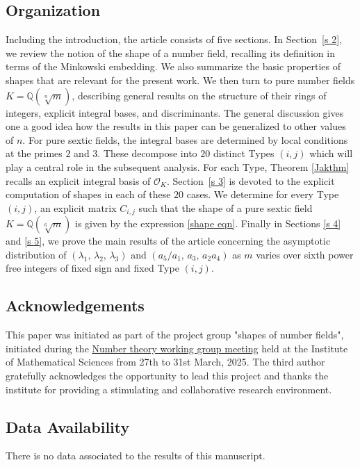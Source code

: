 \documentclass[table]{amsart}
\newcommand{\Q}{\mathbb{Q}}
\newcommand{\cO}{\mathcal{O}}
\numberwithin{equation}{section}
\begin{document}
\subsection{Organization} Including the introduction, the article consists of five sections. In Section~\ref{s 2}, we review the notion of the shape of a number field, recalling its definition in terms of the Minkowski embedding. We also summarize the basic properties of shapes that are relevant for the present work. We then turn to pure number fields \(K=\Q(\sqrt[n]{m})\), describing general results on the structure of their rings of integers, explicit integral bases, and discriminants. The general discussion gives one a good idea how the results in this paper can be generalized to other values of $n$. For pure sextic fields, the integral bases are determined by local conditions at the primes $2$ and $3$. These decompose into \(20\) distinct Types \((i,j)\) which will play a central role in the subsequent analysis.
For each Type, Theorem \ref{Jakthm} recalls an explicit integral basis of $\cO_K$. Section~\ref{s 3} is devoted to the explicit computation of shapes in each of these $20$ cases. We determine for every Type $(i,j)$, an explicit matrix $C_{i,j}$ such that the shape of a pure sextic field $K=\Q(\sqrt[6]{m})$ is given by the expression \eqref{shape eqn}. Finally in Sections \ref{s 4} and \ref{s 5}, we prove the main results of the article concerning the asymptotic distribution of $(\lambda_1,\, \lambda_2,\, \lambda_3)$ and $(a_5/a_1,\, a_3,\, a_2a_4)$ as $m$ varies over sixth power free integers of fixed sign and fixed Type $(i,j)$. 

\subsection*{Acknowledgements} This paper was initiated as part of the project group  "shapes of number fields", initiated during the \href{https://sites.google.com/view/imscnumbertheorygroupmeeting/home}{Number theory working group meeting} held at the Institute of Mathematical Sciences from 27th to 31st March, 2025. The third author gratefully acknowledges the opportunity to lead this project and thanks the institute for providing a stimulating and collaborative research environment. 

\subsection*{Data Availability} There is no data associated to the results of this manuscript.
\end{document}
